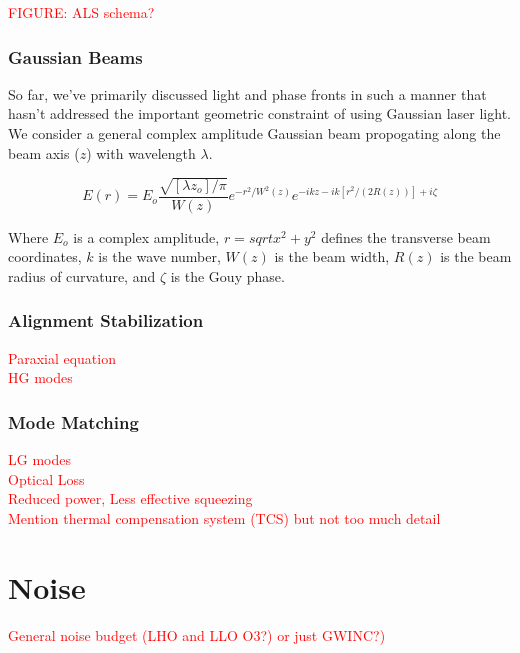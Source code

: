 \textcolor{red}{FIGURE: ALS schema?}

\subsubsection{Gaussian Beams}
So far, we've primarily discussed light and phase fronts in such a manner that hasn't addressed the important geometric constraint of using Gaussian laser light. We consider a general complex amplitude Gaussian beam propogating along the beam axis ($z$) with wavelength $\lambda$.

\begin{equation}\label{eq:gaussian_beam}
E(r) = E_o \frac{\sqrt{[\lambda z_o] / \pi}}{W(z)}e^{-r^2 / W^2(z)} e^{-ikz - ik[r^2 / (2R(z))] + i \zeta}
\end{equation}

Where $E_o$ is a complex amplitude, $r = sqrt{x^2 + y^2}$ defines the transverse beam coordinates, $k$ is the wave number, $W(z)$ is the beam width, $R(z)$ is the beam radius of curvature, and $\zeta$ is the Gouy phase.

\subsubsection{Alignment Stabilization}
\textcolor{red}{Paraxial equation}
\\
\textcolor{red}{HG modes}


\subsubsection{Mode Matching}
\textcolor{red}{LG modes}
\\
\textcolor{red}{Optical Loss}
\\
\textcolor{red}{Reduced power, Less effective squeezing}
\\
\textcolor{red}{Mention thermal compensation system (TCS) but not too much detail}

\section{Noise}

\textcolor{red}{General noise budget (LHO and LLO O3?) or just GWINC?)}

